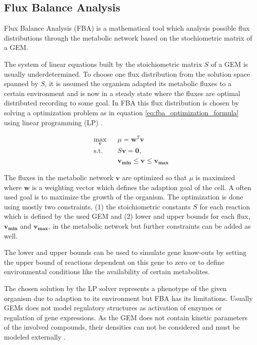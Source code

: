 \subsection{Flux Balance Analysis}\label{ssec:flux_balance_analysis}

Flux Balance Analysis (FBA) is a mathematical tool which analysis possible flux
distributions through the metabolic network based on the stochiometric matrix of 
a GEM.

The system of linear equations built by the stoichiometric matrix $S$ of a GEM is
usually underdetermined. To choose one flux distribution from the solution space
spanned by $S$, it is assumed the organism adapted its metabolic fluxes to a certain
environment and is now in a steady state where the fluxes are optimal distributed
recording to some goal. In FBA this flux distribution is chosen by solving a
optimization problem as in equation \ref{eq:fba_optimization_formula} using linear
programming (LP) \cite{orth_what_2010}.

\begin{equation}\label{eq:fba_optimization_formula}
\begin{aligned}
& \underset{\bm{v}}{\text{max}}
& & \mu = \bm{w}^T \bm{v} \\
& \text{s.t.}
& & S\bm{v} = \bm{0}, \\
&&& \bm{v_{min}} \leq \bm{v} \leq \bm{v_{max}}
\end{aligned}
\end{equation}

The fluxes in the metabolic network $\bm{v}$ are optimized so that $\mu$ is maximized
where $\bm{w}$ is a weighting vector which defines the adaption goal of the cell.
A often used goal is to maximize the growth of the organism.
The optimization is done using mostly two constraints, (1) the stoichiometric constants $S$
for each reaction which is defined by the used GEM and (2) lower and upper bounds for 
each flux, $\bm{v_{min}}$ and $\bm{v_{max}}$, in the metabolic network but further 
constraints can be added as well.

The lower and upper bounds can be used to simulate gene know-outs by setting the upper
bound of reactions dependent on this gene to zero or to define environmental conditions
like the availability of certain metabolites.

The chosen solution by the LP solver represents a phenotype of the given organism
due to adaption to its environment but FBA has its limitations. Usually GEMs does
not model regulatory structures as activation of enzymes or regulation of gene
expressions. As the GEM does not contain kinetic parameters of the involved compounds, 
their densities can not be considered and must be modeled externally \cite{orth_what_2010}.


